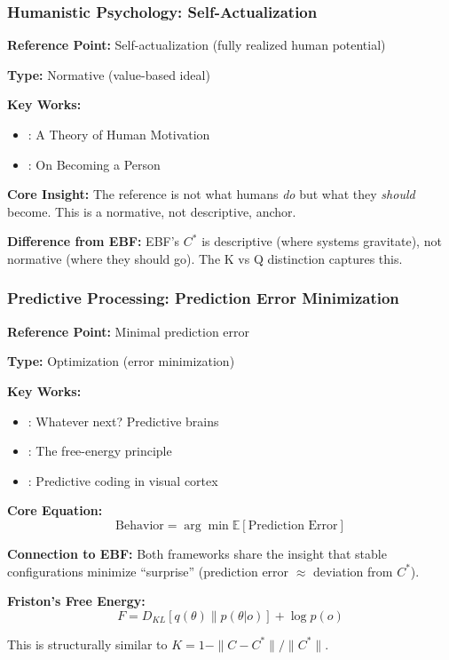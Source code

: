 \subsubsection{Humanistic Psychology: Self-Actualization}

\begin{tcolorbox}[colback=gray!5!white, colframe=gray!75!black]
\textbf{Reference Point:} Self-actualization (fully realized human potential)

\textbf{Type:} Normative (value-based ideal)

\textbf{Key Works:}
\begin{itemize}[nosep]
    \item \citet{maslow1943}: A Theory of Human Motivation
    \item \citet{rogers1961}: On Becoming a Person
\end{itemize}

\textbf{Core Insight:}
The reference is not what humans \emph{do} but what they \emph{should} become.
This is a normative, not descriptive, anchor.

\textbf{Difference from EBF:}
EBF's $C^*$ is descriptive (where systems gravitate), not normative
(where they should go). The K vs Q distinction captures this.
\end{tcolorbox}

\subsubsection{Predictive Processing: Prediction Error Minimization}

\begin{tcolorbox}[colback=gray!5!white, colframe=gray!75!black]
\textbf{Reference Point:} Minimal prediction error

\textbf{Type:} Optimization (error minimization)

\textbf{Key Works:}
\begin{itemize}[nosep]
    \item \citet{clark2013}: Whatever next? Predictive brains
    \item \citet{friston2010}: The free-energy principle
    \item \citet{rao1999}: Predictive coding in visual cortex
\end{itemize}

\textbf{Core Equation:}
\begin{equation}
\text{Behavior} = \arg\min \mathbb{E}[\text{Prediction Error}]
\end{equation}

\textbf{Connection to EBF:}
Both frameworks share the insight that stable configurations minimize
``surprise'' (prediction error $\approx$ deviation from $C^*$).

\textbf{Friston's Free Energy:}
\begin{equation}
F = D_{KL}[q(\theta) \| p(\theta | o)] + \log p(o)
\end{equation}

This is structurally similar to $K = 1 - \|C - C^*\|/\|C^*\|$.
\end{tcolorbox}


